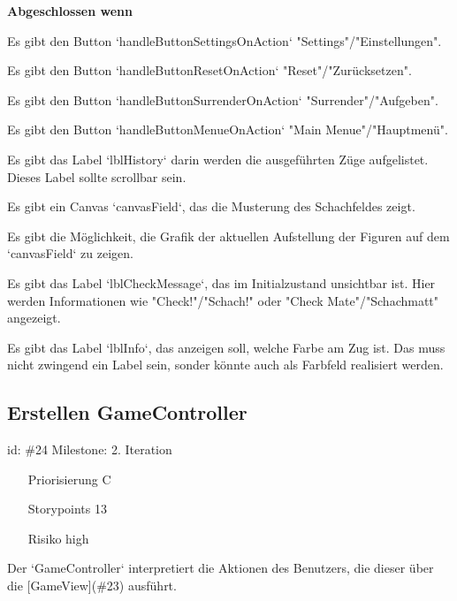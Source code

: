 \textbf{Abgeschlossen wenn}
\begin{todolist}
    \item[\done]  Es gibt den Button `handleButtonSettingsOnAction` "Settings"/"Einstellungen".
  \item[\done]  Es gibt den Button `handleButtonResetOnAction` "Reset"/"Zurücksetzen".
  \item[\done]  Es gibt den Button `handleButtonSurrenderOnAction` "Surrender"/"Aufgeben".
  \item[\done]  Es gibt den Button `handleButtonMenueOnAction` "Main Menue"/"Hauptmenü".
  \item[\done]  Es gibt das Label `lblHistory` darin werden die ausgeführten Züge aufgelistet. Dieses Label sollte scrollbar sein.
  \item[\done]  Es gibt ein Canvas `canvasField`, das die Musterung des Schachfeldes zeigt.
  \item[\done]  Es gibt die Möglichkeit, die Grafik der aktuellen Aufstellung der Figuren auf dem `canvasField` zu zeigen.
  \item[\done]  Es gibt das Label `lblCheckMessage`, das im Initialzustand unsichtbar ist. Hier werden Informationen wie "Check!"/"Schach!" oder "Check Mate"/"Schachmatt" angezeigt.
  \item[\done]  Es gibt das Label `lblInfo`, das anzeigen soll, welche Farbe am Zug ist. Das muss nicht zwingend ein Label sein, sonder könnte auch als Farbfeld realisiert werden.

\end{todolist}


\subsection*{Erstellen GameController}
id: \#24 Milestone: 2. Iteration\\

\begin{itemize}
\item[Priorisierung] C
\item[Storypoints] 13
\item[Risiko] high
\end{itemize}

Der `GameController` interpretiert die Aktionen des Benutzers, die dieser über die [GameView](\#23) ausführt.

